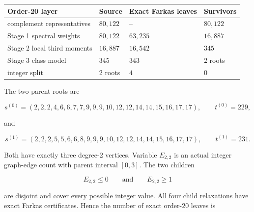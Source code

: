 \documentclass[
  english,
  11pt,
  a4paper,
]{article}
\newcounter{none} %
\begin{document}
{\def\LTcaptype{none} %
\begin{longtable}[]{@{}
  >{\raggedright\arraybackslash}p{}
  >{\raggedleft\arraybackslash}p{}
  >{\raggedleft\arraybackslash}p{}
  >{\raggedleft\arraybackslash}p{}@{}}
\toprule\noalign{}
\begin{minipage}[b]{\linewidth}\raggedright
Order-20 layer
\end{minipage} & \begin{minipage}[b]{\linewidth}\raggedleft
Source
\end{minipage} & \begin{minipage}[b]{\linewidth}\raggedleft
Exact Farkas leaves
\end{minipage} & \begin{minipage}[b]{\linewidth}\raggedleft
Survivors
\end{minipage} \\
\midrule\noalign{}
\endhead
\bottomrule\noalign{}
\endlastfoot
complement representatives & \(80{,}122\) & -- & \(80{,}122\) \\
Stage 1 spectral weights & \(80{,}122\) & \(63{,}235\) & \(16{,}887\) \\
Stage 2 local third moments & \(16{,}887\) & \(16{,}542\) & \(345\) \\
Stage 3 class model & \(345\) & \(343\) & \(2\) roots \\
integer split & \(2\) roots & \(4\) & \(0\) \\
\end{longtable}
}

The two parent roots are

\[
s^{(0)}=(2,2,2,4,6,6,7,7,9,9,9,10,12,12,14,14,15,16,17,17),
\qquad t^{(0)}=229,
\tag{5.9}
\]

and

\[
s^{(1)}=(2,2,2,5,5,6,6,8,9,9,9,10,12,12,14,14,15,16,17,17),
\qquad t^{(1)}=231.
\tag{5.10}
\]

Both have exactly three degree-2 vertices. Variable \(E_{2,2}\) is an
actual integer graph-edge count with parent interval \([0,3]\). The two
children

\[
E_{2,2}\le0
\qquad\text{and}\qquad
E_{2,2}\ge1
\tag{5.11}
\]

are disjoint and cover every possible integer value. All four child
relaxations have exact Farkas certificates. Hence the number of exact
order-20 leaves is
\end{document}
